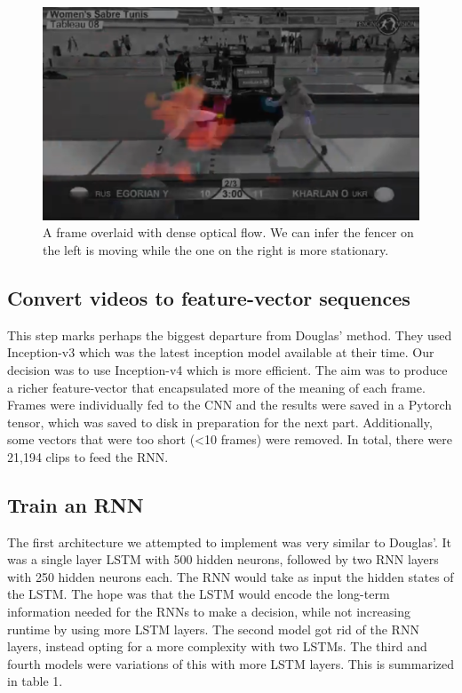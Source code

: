\documentclass[10pt,twocolumn,letterpaper]{article}
\begin{document}
\begin{figure}[h]
\includegraphics[scale=.21]{overlaid_frame.png}
\caption{A frame overlaid with dense optical flow. We can infer the fencer on the left is moving while the one on the right is more stationary.}
\centering
\end{figure}

\subsection{Convert videos to feature-vector sequences}

This step marks perhaps the biggest departure from Douglas' method.
They used Inception-v3 which was the latest inception model available at their time.
Our decision was to use Inception-v4 which is more efficient.
The aim was to produce a richer feature-vector that encapsulated more of the meaning of each frame.
Frames were individually fed to the CNN and the results were saved in a Pytorch tensor, which was saved to disk in preparation for the next part.
Additionally, some vectors that were too short (<10 frames) were removed.
In total, there were 21,194 clips to feed the RNN.

\subsection{Train an RNN}

The first architecture we attempted to implement was very similar to Douglas'.
It was a single layer LSTM with 500 hidden neurons, followed by two RNN layers with 250 hidden neurons each.
The RNN would take as input the hidden states of the LSTM.
The hope was that the LSTM would encode the long-term information needed for the RNNs to make a decision, while not increasing runtime by using more LSTM layers.
The second model got rid of the RNN layers, instead opting for a more complexity with two LSTMs.
The third and fourth models were variations of this with more LSTM layers.
This is summarized in table 1.
\end{document}
